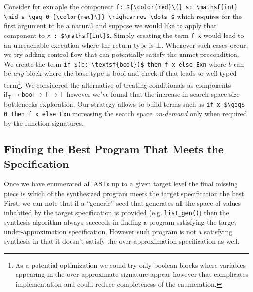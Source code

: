 \documentclass[review, sigplan]{acmart}
\begin{document}
Consider for exmaple the component
\lstinline[basicstyle=\small\ttfamily, mathescape]|f: ${\color{red}\{} s: \mathsf{int} \mid s \geq 0 {\color{red}\}} \rightarrow \dots $|
which requires for the first argument to be a natural and suppose
we would like to apply that component to \lstinline[basicstyle=\small\ttfamily, mathescape]|x : $\mathsf{int}$|.
Simply creating the term \lstinline[language=caml, basicstyle=\small\ttfamily, mathescape]|f x|
would lead to an unreachable execution where the return type is $\bot$.
Whenever such cases occur, we try adding control-flow that can potentially
satisfy the unmet precondition.
We create the term \lstinline[language=caml, basicstyle=\small\ttfamily, mathescape]|if $(b: \textsf{bool})$ then f x else Exn|
where $b$ can be \emph{any} block where the base type is \textsf{bool}
and check if that leads to well-typed term\footnote{
  As a potential optimization we could try only boolean blocks where
  variables appearing in the over-approximate signature appear however
  that complicates implementation and could reduce completeness of the
  enumeration.}.
We considered the alternative of treating conditionals as components
$\textsf{if}_\textsf{T} \rightarrow \textsf{bool} \rightarrow \textsf{T} \rightarrow \textsf{T}$
however we've found that the increase in search space size
bottlenecks exploration.
Our strategy allows to build terms such as
\lstinline[language=caml, basicstyle=\small\ttfamily, mathescape]|if x $\geq$ 0 then f x else Exn|
increasing the search space \emph{on-demand} only when required
by the function signatures.

\subsection{Finding the Best Program That Meets the Specification}
Once we have enumerated all ASTs up to a given target level the
final missing piece is which of the synthesized program
meets the target specification the best.
First, we can note that if a ``generic'' seed that generates
all the space of values inhabited by the target specification is provided
(e.g. \lstinline[language=caml, basicstyle=\small\ttfamily, mathescape]|list_gen()|)
then the synthesis algorithm always succeeds in finding a program satisfying the
target under-approximation specification.
However such program is not a satisfying synthesis in that it doesn't satisfy
the over-approximation specification as well.
\end{document}
